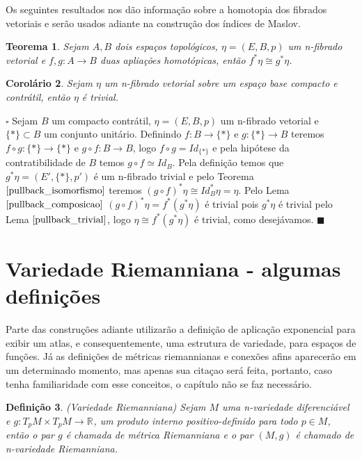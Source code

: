 \documentclass[12pt]{book}
\newtheorem{teorema}{Teorema}[section]
\newtheorem{corolario}[teorema]{Corolário}
\newtheorem{definicao}[teorema]{Definição}
\newenvironment{prova}[1]{$\square$ #1}{\hfill$\blacksquare$}
\newcommand{\real}[1]{\mathbb{R}^{#1}}
\begin{document}
	Os seguintes resultados nos dão informação sobre a homotopia dos fibrados vetoriais e serão usados adiante na construção dos índices de Maslov.
	
	\begin{teorema}\label{pullback_isomorfismo}
		Sejam $A, B$ dois espaços topológicos, $\eta=(E, B, p)$ um n-fibrado vetorial e $f,g: A\to B$ duas apliações homotópicas, então $f^{*}\eta \cong g^{*}\eta$.
	\end{teorema}
	
	\begin{corolario}\label{pullback_contratil}
		Sejam $\eta$ um n-fibrado vetorial sobre um espaço base compacto e contrátil, então $\eta$ é trivial.
	\end{corolario}
	\begin{prova}
		Sejam $B$ um compacto contrátil, $\eta=(E, B, p)$ um n-fibrado vetorial e $\{*\} \subset B$ um conjunto unitário. Definindo $f:B\to \{*\}$ e $g:\{*\}\to B$ teremos $f\circ g : \{*\} \to \{*\}$ e $g\circ f:B\to B$, logo $f\circ g = Id_{\{*\}}$ e pela hipótese da contratibilidade de $B$ temos $g\circ f \simeq Id_{B}$. Pela definição temos que $g^{*}\eta = (E', \{*\}, p')$ é um n-fibrado trivial e pelo Teorema $\ref{pullback_isomorfismo}$ teremos $(g\circ f)^{*}\eta \cong Id_{B}^{*}\eta = \eta$. Pelo Lema $\ref{pullback_composicao}$ $(g\circ f)^{*}\eta = f^{*}(g^{*}\eta) $ é trivial pois $g^{*}\eta$ é trivial pelo Lema $\ref{pullback_trivial}$, logo $ \eta \cong f^{*}(g^{*}\eta)$ é trivial, como desejávamos.
	\end{prova}
	
	\section{Variedade Riemanniana - algumas definições}\label{secao_variedade_riemanniana}
	Parte das construções adiante utilizarão a definição de aplicação exponencial para exibir um atlas, e consequentemente, uma estrutura de variedade, para espaços de funções. Já as definições de métricas riemannianas e conexões afins aparecerão em um determinado momento, mas apenas sua citaçao será feita, portanto, caso tenha familiaridade com esse conceitos, o capítulo não se faz necessário.
	
	\begin{definicao}\label{definicao_variedade_riemanniana}
		(Variedade Riemanniana) Sejam $M$ uma n-variedade diferenciável e $g:T_{p}M \times T_{p}M \to \real{}$, um produto interno positivo-definido para todo $p \in M$, então o par $g$ é chamada de métrica Riemanniana e o par $(M, g)$ é chamado de n-variedade Riemanniana.
	\end{definicao}
	
\end{document}
